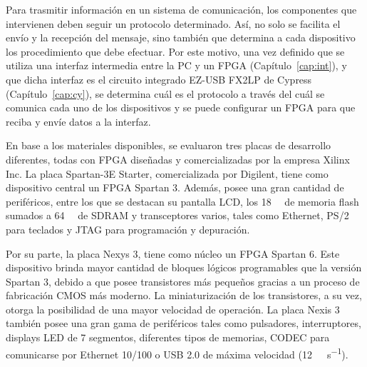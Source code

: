 
Para trasmitir información en un sistema de comunicación, los componentes que intervienen deben seguir un protocolo determinado. Así, no solo se facilita el envío y la recepción del mensaje, sino también que determina a cada dispositivo los procedimiento que debe efectuar. Por este motivo, una vez definido que se utiliza una interfaz intermedia entre la PC y un FPGA (Capítulo~\ref{cap:int}), y que dicha interfaz es el circuito integrado EZ-USB FX2LP de Cypress (Capítulo~\ref{cap:cy}), se determina cuál es el protocolo a través del cuál se comunica cada uno de los dispositivos y se puede configurar un FPGA para que reciba y envíe datos a la interfaz.

En base a los materiales disponibles, se evaluaron tres placas de desarrollo diferentes, todas con FPGA diseñadas y comercializadas por la empresa Xilinx Inc. La placa Spartan-3E Starter, comercializada por Digilent, tiene como dispositivo central un FPGA Spartan 3. Además, posee una gran cantidad de periféricos, entre los que se destacan su pantalla LCD, los \SI{18}{\mega\byte} de memoria flash sumados a \SI{64}{\mega\byte} de SDRAM y transceptores varios, tales como Ethernet, PS/2 para teclados y JTAG para programación y depuración.

Por su parte, la placa Nexys 3, tiene como núcleo un FPGA Spartan 6. Este dispositivo brinda mayor cantidad de bloques lógicos programables que la versión Spartan 3, debido a que posee transistores más pequeños gracias a un proceso de fabricación CMOS más moderno. La miniaturización de los transistores, a su vez, otorga la posibilidad de una mayor velocidad de operación. La placa Nexis 3 también posee una gran gama de periféricos tales como pulsadores, interruptores, displays LED de 7 segmentos, diferentes tipos de memorias, CODEC para comunicarse por Ethernet 10/100 o USB 2.0 de máxima velocidad (\SI{12}{\mega\bit\per\second}).

